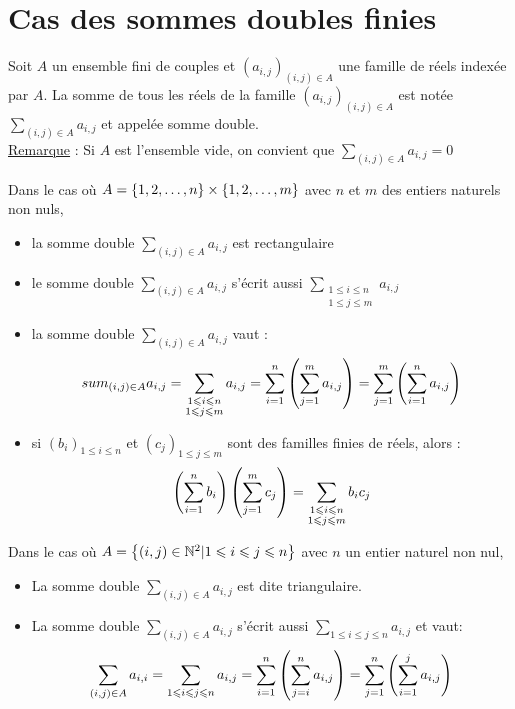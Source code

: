 \section{Cas des sommes doubles finies}
\begin{defi}
	Soit \(A\) un ensemble fini de couples et \((a_{i,j})_{(i,j)\in A}\) une famille de réels indexée par \(A\). La somme de tous les réels de la famille \((a_{i,j})_{(i,j)\in A}\) est notée \(\sum_{(i,j)\in A} a_{i,j}\) et appelée somme double. \\
	\underline{Remarque} : Si \(A\) est l'ensemble vide, on convient que \(\sum_{(i,j)\in A} a_{i,j} = 0\)
\end{defi}
\begin{defprop}
	Dans le cas où \(A = \left\lbrace1,2,\ldots,n\right\rbrace\times \left\lbrace1,2,\ldots,m\right\rbrace\) avec \(n\) et \(m\) des entiers naturels non nuls,
	\begin{itemize}
		\item la somme double \(\sum_{(i,j)\in A} a_{i,j}\) est rectangulaire
		\item le somme double \(\sum_{(i,j)\in A} a_{i,j}\) s'écrit aussi \(\sum_{\substack{1 \leq i \leq n \\ 1 \leq j \leq m}} a_{i,j}\)
		\item la somme double \(\sum_{(i,j)\in A} a_{i,j}\) vaut  :
		      \[ sum_{(i,j)\in A} a_{i,j} = \sum_{\substack{1 \leqslant i \leqslant n \\ 1 \leqslant j \leqslant m}} a_{i,j} = \sum_{i=1}^n \left(\sum_{j=1}^m a_{i,j}\right) = \sum_{j=1}^m \left(\sum_{i=1}^n a_{i,j}\right) \]
		\item si \((b_i)_{1\leq i \leq n}\) et \((c_j)_{1\leq j \leq m}\) sont des familles finies de réels, alors : \[\left(\sum_{i=1}^n b_i\right)\left(\sum_{j=1}^m c_j\right) = \sum_{\substack{1 \leqslant i \leqslant n \\ 1 \leqslant j \leqslant m}} b_i c_j\]
	\end{itemize}
\end{defprop}

\begin{defprop}
	Dans le cas où \(A = \left\lbrace(i,j) \in \mathbb{N}^2 | 1 \leqslant i \leqslant j \leqslant n\right\rbrace\) avec \(n\) un entier naturel non nul,
	\begin{itemize}
		\item La somme double \(\sum_{(i,j)\in A} a_{i,j}\) est dite triangulaire.
		\item La somme double \(\sum_{(i,j)\in A} a_{i,j}\) s'écrit aussi \(\sum_{1\leq i \leq j \leq n} a_{i,j}\) et vaut:
		      \[\sum_{(i,j)\in A} a_{i,i} = \sum_{1\leqslant i \leqslant j \leqslant n} a_{i,j} = \sum_{i=1}^n \left(\sum_{j=i}^n a_{i,j}\right) = \sum_{j=1}^n \left(\sum_{i=1}^j a_{i,j}\right)\]
	\end{itemize}
\end{defprop}




